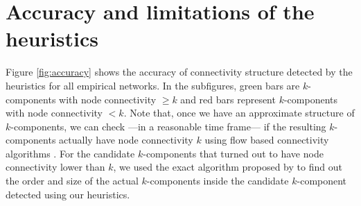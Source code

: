 \section{Accuracy and limitations of the heuristics}
\label{accuracy}

Figure \ref{fig:accuracy} shows the accuracy of connectivity structure detected by the heuristics for all empirical networks. In the subfigures, green bars are $k$-components with node connectivity $\ge k$ and red bars represent $k$-components with node connectivity $< k$.  Note that, once we have an approximate structure of $k$-components, we can check ---in a reasonable time frame--- if the resulting $k$-components actually have node connectivity $k$ using flow based connectivity algorithms \citep[chapter 7]{brandes:2005}. For the candidate $k$-components that turned out to have node connectivity lower than $k$, we used the exact algorithm proposed by \citet{moody:2003} to find out the order and size of the actual $k$-components inside the candidate $k$-component detected using our heuristics.

